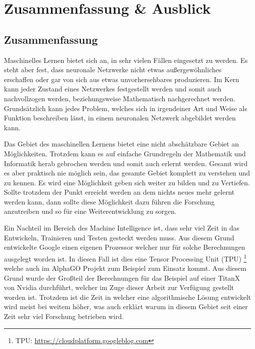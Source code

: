 \chapter{Zusammenfassung \& Ausblick}
\label{cha:ZusammenfassungAusblick}

\section{Zusammenfassung}

\noindent
Maschinelles Lernen bietet sich an, in sehr vielen Fällen eingesetzt zu werden. 
Es steht aber fest, dass neuronale Netzwerke nicht etwas außergewöhnliches erschaffen oder gar von sich aus etwas unvorhersehbares produzieren. 
Im Kern kann jeder Zustand eines Netzwerkes festgestellt werden und somit auch nachvollzogen werden, beziehungsweise Mathematisch nachgerechnet werden. 
Grundsätzlich kann jedes Problem, welches sich in irgendeiner Art und Weise als Funktion beschreiben lässt, in einem neuronalen Netzwerk abgebildet werden kann. \newline

\noindent
Das Gebiet des maschinellen Lernens bietet eine nicht abschätzbare Gebiet an Möglichkeiten. 
Trotzdem kann es auf einfache Grundregeln der Mathematik und Informatik herab gebrochen werden und somit auch erlernt werden. 
Gesamt wird es aber praktisch nie möglich sein, das gesamte Gebiet komplett zu verstehen und zu kennen.
Es wird eine Möglichkeit geben sich weiter zu bilden und zu Vertiefen. 
Sollte trotzdem der Punkt erreicht werden an dem nichts neues mehr gelernt werden kann, dann sollte diese Möglichkeit dazu führen die Forschung anzutreiben und so für eine Weiterentwicklung zu sorgen. \newline

\noindent
Ein Nachteil im Bereich des Machine Intelligence ist, dass sehr viel Zeit in das Entwickeln, Trainieren und Testen gesteckt werden muss. 
Aus diesem Grund entwickelte Google einen eigenen Prozessor welcher nur für solche Berechnungen ausgelegt worden ist. 
In diesen Fall ist dies eine Tensor Processing Unit (TPU) \footnote{TPU: \url{https://cloudplatform.googleblog.com}} welche auch im AlphaGO Projekt zum Beispiel zum Einsatz kommt. 
Aus diesem Grund wurde der Großteil der Berechnungen für das Beispiel auf einer TitanX von Nvidia durchführt, welcher im Zuge dieser Arbeit zur Verfügung gestellt worden ist. 
Trotzdem ist die Zeit in welcher eine algorithmische Lösung entwickelt wird meist bei weitem höher, was auch erklärt warum in diesem Gebiet seit einer Zeit sehr viel Forschung betrieben wird. 

